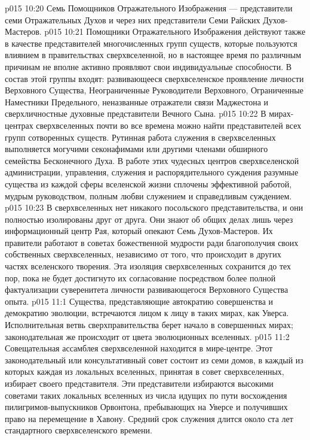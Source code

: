 \vs p015 10:20 \bibnobreakspace Семь Помощников Отражательного Изображения --- представители семи Отражательных Духов и через них представители Семи Райских Духов\hyp{}Мастеров.
\vs p015 10:21 \pc Помощники Отражательного Изображения действуют также в качестве представителей многочисленных групп существ, которые пользуются влиянием в правительствах сверхвселенной, но в настоящее время по различным причинам не вполне активно проявляют свои индивидуальные способности. В состав этой группы входят: развивающееся сверхвселенское проявление личности Верховного Существа, Неограниченные Руководители Верховного, Ограниченные Наместники Предельного, неназванные отражатели связи Маджестона и сверхличностные духовные представители Вечного Сына.
\vs p015 10:22 \pc В мирах\hyp{}центрах сверхвселенных почти во все времена можно найти представителей всех групп сотворенных существ. Рутинная работа служения в сверхвселенных выполняется могучими секонафимами или другими членами обширного семейства Бесконечного Духа. В работе этих чудесных центров сверхвселенской администрации, управления, служения и распорядительного суждения разумные существа из каждой сферы вселенской жизни сплочены эффективной работой, мудрым руководством, полным любви служением и справедливым суждением.
\vs p015 10:23 В сверхвселенных нет никакого посольского представительства, и они полностью изолированы друг от друга. Они знают об общих делах лишь через информационный центр Рая, который опекают Семь Духов\hyp{}Мастеров. Их правители работают в советах божественной мудрости ради благополучия своих собственных сверхвселенных, независимо от того, что происходит в других частях вселенского творения. Эта изоляция сверхвселенных сохранится до тех пор, пока не будет достигнуто их согласование посредством более полной фактуализации суверенитета личности развивающегося Верховного Существа опыта.
\vs p015 11:1 Существа, представляющие автократию совершенства и демократию эволюции, встречаются лицом к лицу в таких мирах, как Уверса. Исполнительная ветвь сверхправительства берет начало в совершенных мирах; законодательная же происходит от цвета эволюционных вселенных.
\vs p015 11:2 Совещательная ассамблея сверхвселенной находится в мире\hyp{}центре. Этот законодательный или консультативный совет состоит из семи домов, в каждый из которых каждая из локальных вселенных, принятая в совет сверхвселенных, избирает своего представителя. Эти представители избираются высокими советами таких локальных вселенных из числа идущих по пути восхождения пилигримов\hyp{}выпускников Орвонтона, пребывающих на Уверсе и получивших право на перемещение в Хавону. Средний срок служения длится около ста лет стандартного сверхвселенского времени.
